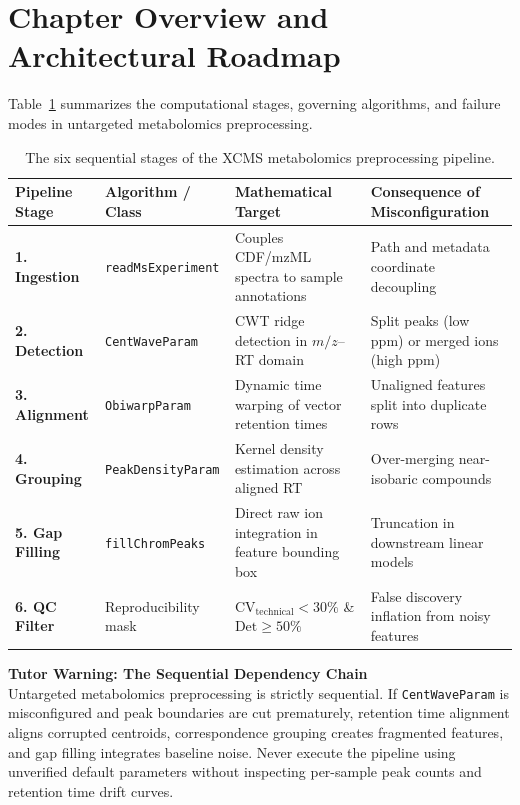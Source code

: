 \documentclass[11pt,twoside,openright]{book}
\begin{document}
\vspace{1em}
\section*{Chapter Overview and Architectural Roadmap}

Table~\ref{tab:xcms_roadmap} summarizes the computational stages, governing algorithms, and failure modes in untargeted metabolomics preprocessing.

\begin{table}[htbp]
\centering
\caption{The six sequential stages of the XCMS metabolomics preprocessing pipeline.}
\label{tab:xcms_roadmap}
\small
\begin{tabularx}{\textwidth}{>{\raggedright\arraybackslash}l >{\raggedright\arraybackslash}p{3.5cm} >{\raggedright\arraybackslash}X >{\raggedright\arraybackslash}p{2.8cm}}
\toprule
\textbf{Pipeline Stage} & \textbf{Algorithm / Class} & \textbf{Mathematical Target} & \textbf{Consequence of Misconfiguration} \\
\midrule
\textbf{1. Ingestion} & \texttt{readMsExperiment} \cite{rainer2022msexperiment} & Couples CDF/mzML spectra to sample annotations & Path and metadata coordinate decoupling \\
\addlinespace
\textbf{2. Detection} & \texttt{CentWaveParam} \cite{tautenhahn2008centwave} & CWT ridge detection in $m/z$--RT domain & Split peaks (low ppm) or merged ions (high ppm) \\
\addlinespace
\textbf{3. Alignment} & \texttt{ObiwarpParam} \cite{prince2006obiwarp} & Dynamic time warping of vector retention times & Unaligned features split into duplicate rows \\
\addlinespace
\textbf{4. Grouping} & \texttt{PeakDensityParam} \cite{smith2006xcms} & Kernel density estimation across aligned RT & Over-merging near-isobaric compounds \\
\addlinespace
\textbf{5. Gap Filling} & \texttt{fillChromPeaks} & Direct raw ion integration in feature bounding box & Truncation in downstream linear models \\
\addlinespace
\textbf{6. QC Filter} & Reproducibility mask \cite{broadhurst2018guidelines} & $\text{CV}_{\text{technical}} < 30\%$ \& $\text{Det} \ge 50\%$ & False discovery inflation from noisy features \\
\bottomrule
\end{tabularx}
\end{table}

\begin{notebox}
\textbf{Tutor Warning: The Sequential Dependency Chain}\\[0.4em]
Untargeted metabolomics preprocessing is strictly sequential. If \texttt{CentWaveParam} is misconfigured and peak boundaries are cut prematurely, retention time alignment aligns corrupted centroids, correspondence grouping creates fragmented features, and gap filling integrates baseline noise. Never execute the pipeline using unverified default parameters without inspecting per-sample peak counts and retention time drift curves.
\end{notebox}
\end{document}
